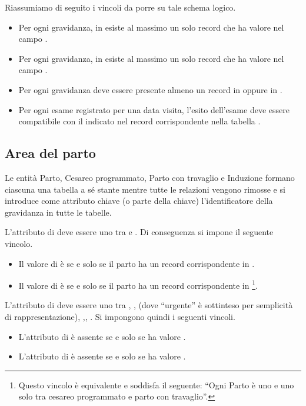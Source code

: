 Riassumiamo di seguito i vincoli da porre su tale schema logico.
\begin{itemize}
\item[\Con{}] Per ogni gravidanza, in  esiste al massimo un solo record che ha valore  nel campo .
\item[\Con{}] Per ogni gravidanza, in  esiste al massimo un solo record che ha valore  nel campo .
\item[\Con{}] Per ogni gravidanza deve essere presente almeno un record in  oppure in .
\item[\Con{}] Per ogni esame registrato per una data visita, l'esito dell'esame deve essere compatibile con il  indicato nel record corrispondente nella tabella .
\end{itemize}

\subsection{Area del parto}
\label{logicaldelivery}

Le entità Parto, Cesareo programmato, Parto con travaglio e Induzione formano ciascuna una tabella a sé stante mentre tutte le relazioni vengono rimosse e si introduce come attributo chiave (o parte della chiave) l'identificatore della gravidanza in tutte le tabelle.

L'attributo  di  deve essere uno tra  e .
Di conseguenza si impone il seguente vincolo.
\begin{itemize}
\item[\Con{}] Il valore di  è  se e solo se il parto ha un record corrispondente in .
\item[\Con{}] Il valore di  è  se e solo se il parto ha un record corrispondente in \footnote{
    Questo vincolo è equivalente e soddisfa il seguente: \enquote{Ogni Parto è uno e uno solo tra cesareo programmato e parto con travaglio}.
}.
\end{itemize}

L'attributo  di  deve essere uno tra , ,  (dove \enquote{urgente} è sottinteso per semplicità di rappresentazione), ,\linebreak {}, .
Si impongono quindi i seguenti vincoli.
\begin{itemize}
\item[\Con{}] L'attributo  di  è assente se e solo se  ha valore .
\item[\Con{}] L'attributo  di  è assente se e solo se  ha valore .
\end{itemize}

